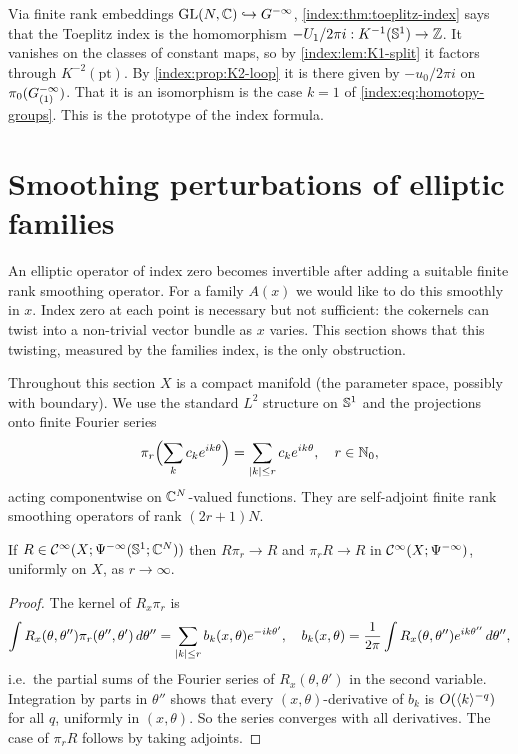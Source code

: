 \begin{remark}\label{index:rem:toeplitz-K}
  Via finite rank embeddings $\operatorname{GL}(N,\mathbb{C})\hookrightarrow G^{-\infty}$,
  \cref{index:thm:toeplitz-index} says that the Toeplitz index is the
  homomorphism $-U_1/2\pi i:K^{-1}(\mathbb{S}^1)\to\mathbb{Z}$. It vanishes on the
  classes of constant maps, so by \cref{index:lem:K1-split} it factors through
  $K^{-2}(\mathrm{pt})$. By \cref{index:prop:K2-loop} it is there given by
  $-u_0/2\pi i$ on $\pi_0(G^{-\infty}_{(1)})$. That it is an isomorphism is the case
  $k=1$ of \eqref{index:eq:homotopy-groups}. This is the prototype of the
  index formula.
\end{remark}

\section{Smoothing perturbations of elliptic families}\label{index:sec:families}

An elliptic operator of index zero becomes invertible after adding a suitable
finite rank smoothing operator. For a family $A(x)$ we would like to do this
smoothly in $x$. Index zero at each point is necessary but not sufficient: the
cokernels can twist into a non-trivial vector bundle as $x$ varies. This section
shows that this twisting, measured by the families index, is the only
obstruction.

Throughout this section $X$ is a compact manifold (the parameter space,
possibly with boundary). We use the standard $L^2$ structure on
$\mathbb{S}^1$ and the projections onto finite Fourier series
\begin{equation*}
  \pi_r\Bigl(\sum_kc_ke^{ik\theta}\Bigr)=\sum_{\lvert k\rvert\le r}c_ke^{ik\theta},
  \quad r\in\mathbb{N}_0,
\end{equation*}
acting componentwise on $\mathbb{C}^N$-valued functions. They are self-adjoint finite
rank smoothing operators of rank $(2r+1)N$.

\begin{lemma}\label{index:lem:pi-r}
  If $R\in\mathcal{C}^\infty(X;\Psi^{-\infty}(\mathbb{S}^1;\mathbb{C}^N))$ then $R\pi_r\to R$ and
  $\pi_rR\to R$ in $\mathcal{C}^\infty(X;\Psi^{-\infty})$, uniformly on $X$, as
  $r\to\infty$.
\end{lemma}
\begin{proof}
  The kernel of $R_x\pi_r$ is
  \begin{equation*}
    \int R_x(\theta,\theta'')\pi_r(\theta'',\theta')\,d\theta''=
    \sum_{\lvert k\rvert\le r}b_k(x,\theta)e^{-ik\theta'},\quad
    b_k(x,\theta)=\frac1{2\pi}\int R_x(\theta,\theta'')e^{ik\theta''}\,d\theta'',
  \end{equation*}
  i.e.\ the partial sums of the Fourier series of $R_x(\theta,\theta')$ in the
  second variable. Integration by parts in $\theta''$ shows that every
  $(x,\theta)$-derivative of $b_k$ is $O(\langle k\rangle^{-q})$ for all $q$, uniformly
  in $(x,\theta)$. So the series converges with all derivatives. The case of
  $\pi_rR$ follows by taking adjoints.
\end{proof}

